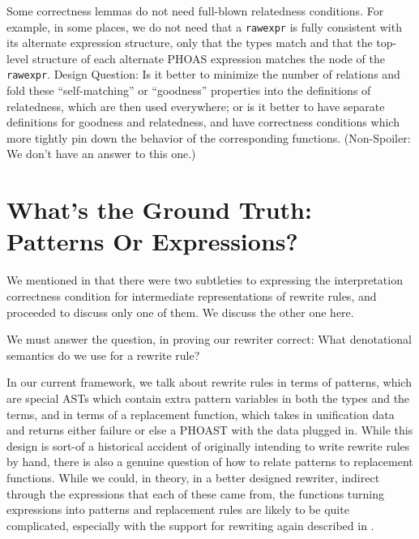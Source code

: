 Some correctness lemmas do not need full-blown relatedness conditions.
For example, in some places, we do not need that a \texttt{rawexpr} is fully consistent with its alternate expression structure, only that the types match and that the top-level structure of each alternate PHOAS expression matches the node of the \texttt{rawexpr}.
Design Question: Is it better to minimize the number of relations and fold these ``self-matching'' or ``goodness'' properties into the definitions of relatedness, which are then used everywhere; or is it better to have separate definitions for goodness and relatedness, and have correctness conditions which more tightly pin down the behavior of the corresponding functions.
(Non-Spoiler: We don't have an answer to this one.)


\section{What's the Ground Truth: Patterns Or Expressions?}\label{sec:rewriting-more:patterns-vs-expressions}
We mentioned in  that there were two subtleties to expressing the interpretation correctness condition for intermediate representations of rewrite rules, and proceeded to discuss only one of them.
We discuss the other one here.

We must answer the question, in proving our rewriter correct:
What denotational semantics do we use for a rewrite rule?

In our current framework, we talk about rewrite rules in terms of patterns, which are special ASTs which contain extra pattern variables in both the types and the terms, and in terms of a replacement function, which takes in unification data and returns either failure or else a PHOAST with the data plugged in.
While this design is sort-of a historical accident of originally intending to write rewrite rules by hand, there is also a genuine question of how to relate patterns to replacement functions.
While we could, in theory, in a better designed rewriter, indirect through the expressions that each of these came from, the functions turning expressions into patterns and replacement rules are likely to be quite complicated, especially with the support for rewriting again described in .

